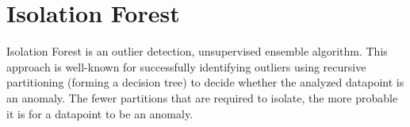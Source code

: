 \section{Isolation Forest}
\label{sec:isolation_forest}

Isolation Forest
\cite{liu2008isolation} \cite{liu2012isolation} is an outlier
detection, unsupervised ensemble algorithm. This approach is well-known for successfully identifying outliers using recursive partitioning (forming a decision tree) to decide whether the analyzed datapoint is an anomaly. The fewer partitions that are required to isolate, the more probable it is for a datapoint to be an anomaly.







